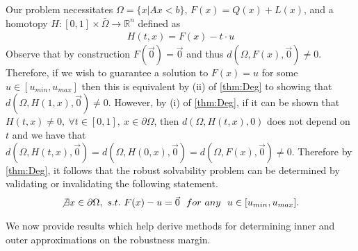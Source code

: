 \documentclass[11pt]{article}
\theoremstyle{plain}
\theoremstyle{definition}
\theoremstyle{remark}
\begin{document}
Our problem necessitates $\Omega=\{x| Ax< b\}$, $F(x)=Q(x)+L(x)$, and a homotopy $H : [0,1]\times\bar{\Omega}\rightarrow\mathbb{R}^n$ defined as 
\begin{align}
H(t,x) = F(x)-t\cdot u \label{eq:Homo}
\end{align}
Observe that by construction $F(\vec{0})=\vec{0}$ and thus $d(\Omega,F(x),\vec{0})\neq 0$. Therefore, if we wish to guarantee a solution to $F(x)=u$ for some $u\in[u_{min},u_{max}]$ then this is equivalent by (ii) of \cref{thm:Deg} to showing that $d(\Omega,H(1,x),\vec{0})\neq 0$. However, by (i) of \cref{thm:Deg}, if it can be shown that $H(t,x)\neq 0, \  \forall t\in[0,1], \  x\in\partial\Omega$, then $d\left(\Omega,H(t,x),0\right)$ does not depend on $t$ and we have that $d\left(\Omega,H(t,x),\vec{0}\right)=d\left(\Omega,H(0,x),\vec{0}\right)=d(\Omega,F(x),\vec{0})\neq 0$. Therefore by \cref{thm:Deg}, it follows that the robust solvability problem can be determined by validating or invalidating the following statement.
\begin{align}
\not\exists x\in\partial\Omega, \ s.t. \ F(x)-u=\vec{0}	 \ \ for \ any \ \ u\in[u_{min},u_{max}]. \label{eq:RSForm}
\end{align}

We now provide results which help derive methods for determining inner and outer approximations on the robustness margin.\\
\end{document}
